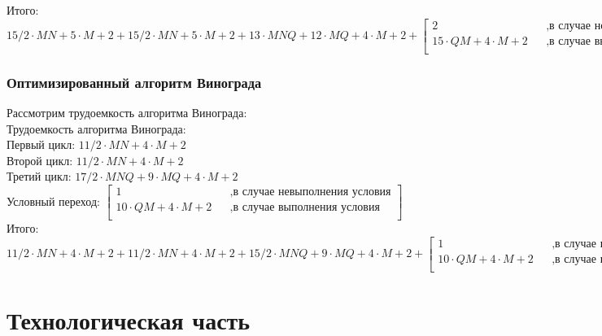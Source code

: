 \documentclass[12pt]{report}
\begin{document}
Итого: $15/2 \cdot M  N + 5 \cdot M + 2 + 15/2 \cdot M  N + 5 \cdot M + 2 + 13 \cdot M  N Q + 12 \cdot M Q + 4 \cdot M + 2 +
       \begin{bmatrix}
             2    &&, \text{в случае невыполнения условия}\\
             15 \cdot QM + 4 \cdot M + 2 &&, \text{в случае выполнения условия}\\
           \end{bmatrix} $ \\

\subsection{Оптимизированный алгоритм Винограда}

Рассмотрим трудоемкость алгоритма Винограда:\\

Трудоемкость алгоритма Винограда:\\

Первый цикл: $11/2 \cdot M  N + 4 \cdot M + 2$ \\

Второй цикл: $11/2 \cdot M  N + 4 \cdot M + 2$\\

Третий цикл: $17/2 \cdot M  N Q + 9 \cdot M Q + 4 \cdot M + 2$\\

Условный переход: $\begin{bmatrix}
             1    &&, \text{в случае невыполнения условия}\\
             10 \cdot QM + 4 \cdot M + 2 &&, \text{в случае выполнения условия}\\
           \end{bmatrix} $ \\

Итого: $11/2 \cdot M  N + 4 \cdot M + 2 + 11/2 \cdot M  N + 4 \cdot M + 2 + 15/2 \cdot M  N Q + 9 \cdot M Q + 4 \cdot M + 2 +
       \begin{bmatrix}
             1    &&, \text{в случае невыполнения условия}\\
             10 \cdot QM + 4 \cdot M + 2 &&, \text{в случае выполнения условия}\\
           \end{bmatrix} $ \\



\chapter{Технологическая часть}
\end{document}
